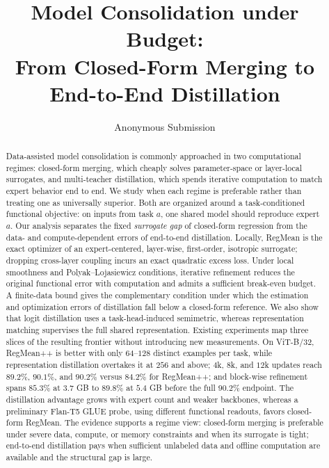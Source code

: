 \documentclass[letterpaper]{article} %
\title{Model Consolidation under Budget:\\
From Closed-Form Merging to End-to-End Distillation}
\author{Anonymous Submission}
\theoremstyle{plain}
\theoremstyle{definition}
\begin{document}
\maketitle

\begin{abstract}
Data-assisted model consolidation is commonly approached in two computational regimes: closed-form merging, which cheaply solves parameter-space or layer-local surrogates, and multi-teacher distillation, which spends iterative computation to match expert behavior end to end.
We study when each regime is preferable rather than treating one as universally superior.
Both are organized around a task-conditioned functional objective: on inputs from task $a$, one shared model should reproduce expert $a$.
Our analysis separates the fixed \emph{surrogate gap} of closed-form regression from the data- and compute-dependent errors of end-to-end distillation.
Locally, RegMean is the exact optimizer of an expert-centered, layer-wise, first-order, isotropic surrogate; dropping cross-layer coupling incurs an exact quadratic excess loss.
Under local smoothness and Polyak--Lojasiewicz conditions, iterative refinement reduces the original functional error with computation and admits a sufficient break-even budget.
A finite-data bound gives the complementary condition under which the estimation and optimization errors of distillation fall below a closed-form reference.
We also show that logit distillation uses a task-head-induced semimetric, whereas representation matching supervises the full shared representation.
Existing experiments map three slices of the resulting frontier without introducing new measurements.
On ViT-B/32, RegMean++ is better with only $64$--$128$ distinct examples per task, while representation distillation overtakes it at $256$ and above; $4$k, $8$k, and $12$k updates reach $89.2\%$, $90.1\%$, and $90.2\%$ versus $84.2\%$ for RegMean++; and block-wise refinement spans $85.3\%$ at $3.7$ GB to $89.8\%$ at $5.4$ GB before the full $90.2\%$ endpoint.
The distillation advantage grows with expert count and weaker backbones, whereas a preliminary Flan-T5 GLUE probe, using different functional readouts, favors closed-form RegMean.
The evidence supports a regime view: closed-form merging is preferable under severe data, compute, or memory constraints and when its surrogate is tight; end-to-end distillation pays when sufficient unlabeled data and offline computation are available and the structural gap is large.
\end{abstract}
\end{document}
